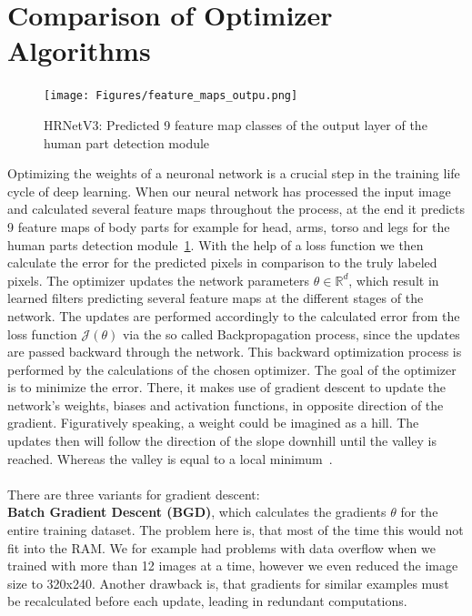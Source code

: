 \section{Comparison of Optimizer Algorithms}
\label{optimizers}
\begin{figure}[H]
    \centering
    \texttt{[image: Figures/feature\_maps\_outpu.png]}
    \decoRule
    \caption[HRNetV3: Prediceted Feature Maps]{HRNetV3: Predicted 9 feature map classes of the output layer of the
    human part detection module}
    \label{fig:feature-maps-output}
\end{figure}
Optimizing the weights of a neuronal network is a crucial step in the training life cycle of deep learning.
When our neural network has processed the input image and calculated several feature maps throughout the process,
at the end it predicts 9 feature maps of body parts for example for head, arms, torso and legs for the human parts
detection module~\ref{fig:feature-maps-output}.
With the help of a loss function we then calculate the error for the predicted pixels in comparison to the truly labeled
pixels.
The optimizer updates the network parameters $\theta \in \mathbb{R}^d$, which result in learned filters predicting several feature maps at
the different stages of the network.
The updates are performed accordingly to the calculated error from the loss function $\mathcal{J}(\theta)$ via the
so called Backpropagation process, since the updates are passed backward through the network.
This backward optimization process is performed by the calculations of the chosen optimizer.
The goal of the optimizer is to minimize the error.
There, it makes use of gradient descent to update the network's weights, biases and activation functions, in opposite direction
of the gradient.
Figuratively speaking, a weight could be imagined as a hill.
The updates then will follow the direction of the slope downhill until the valley is reached.
Whereas the valley is equal to a local minimum~\cite{optimizersoverview}.
\\\mbox{}\\
There are three variants for gradient descent:\\
\textbf{Batch Gradient Descent (BGD)}, which calculates the gradients $\theta$ for the entire training dataset.
The problem here is, that most of the time this would not fit into the RAM.
We for example had problems with data overflow when we trained with more than 12 images at a time, however we even reduced
the image size to 320x240.
Another drawback is, that gradients for similar examples must be recalculated before each update, leading in redundant computations.\\
